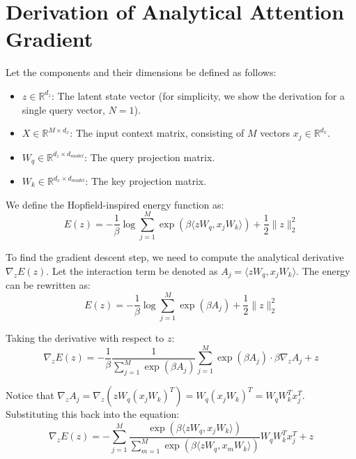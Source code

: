 \documentclass[11pt,a4paper]{article}
\begin{document}
\appendix
\section{Derivation of Analytical Attention Gradient}
\label{sec:appendix_derivation}

Let the components and their dimensions be defined as follows:
\begin{itemize}[leftmargin=1.5em]
    \item $z \in \mathbb{R}^{d_z}$: The latent state vector (for simplicity, we show the derivation for a single query vector, $N=1$).
    \item $X \in \mathbb{R}^{M \times d_x}$: The input context matrix, consisting of $M$ vectors $x_j \in \mathbb{R}^{d_x}$.
    \item $W_q \in \mathbb{R}^{d_z \times d_{model}}$: The query projection matrix.
    \item $W_k \in \mathbb{R}^{d_x \times d_{model}}$: The key projection matrix.
\end{itemize}

We define the Hopfield-inspired energy function as:
\begin{equation}
    E(z) = -\frac{1}{\beta} \log \sum_{j=1}^M \exp\left( \beta \langle z W_q, x_j W_k \rangle \right) + \frac{1}{2} \|z\|_2^2
\end{equation}

To find the gradient descent step, we need to compute the analytical derivative $\nabla_z E(z)$. Let the interaction term be denoted as $A_j = \langle z W_q, x_j W_k \rangle$. The energy can be rewritten as:
\begin{equation}
    E(z) = -\frac{1}{\beta} \log \sum_{j=1}^M \exp\left( \beta A_j \right) + \frac{1}{2} \|z\|_2^2
\end{equation}

Taking the derivative with respect to $z$:
\begin{equation}
    \nabla_z E(z) = -\frac{1}{\beta} \frac{1}{\sum_{j=1}^M \exp(\beta A_j)} \sum_{j=1}^M \exp(\beta A_j) \cdot \beta \nabla_z A_j + z
\end{equation}

Notice that $\nabla_z A_j = \nabla_z (z W_q (x_j W_k)^T) = W_q (x_j W_k)^T = W_q W_k^T x_j^T$. Substituting this back into the equation:
\begin{equation}
    \nabla_z E(z) = - \sum_{j=1}^M \frac{\exp(\beta \langle z W_q, x_j W_k \rangle)}{\sum_{m=1}^M \exp(\beta \langle z W_q, x_m W_k \rangle)} W_q W_k^T x_j^T + z
\end{equation}
\end{document}
